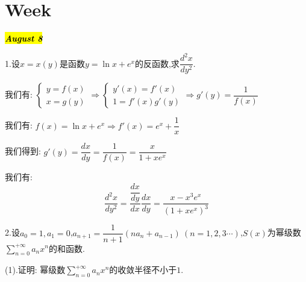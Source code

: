 \section{Week }
\hl{\textbf{\textit{August 8}}}

1.设$x=x(y)$是函数$y=\ln x+e^x$的反函数,求$\dfrac{d^2x}{dy^2}$.
\begin{solution}

	我们有:  $\left\lbrace
	\begin{array}{l}
		y=f(x)\\
		x=g(y)
	\end{array}
	\right. \Rightarrow \left\lbrace
	\begin{array}{l}
		y'(x)=f'(x)\\
		1=f'(x)g'(y)
	\end{array}
	\right. \Rightarrow g'(y)=\dfrac{1}{f(x)}$
	
	我们有:  $f(x)=\ln x+e^x\Rightarrow f'(x)=e^x+\dfrac{1}{x}$
	
	我们得到:  $g'(y)=\dfrac{dx}{dy}=\dfrac{1}{f(x)}=\dfrac{x}{1+xe^x}$
	
	我们有:  
	$$\dfrac{d^2x}{dy^2}=\dfrac{\dfrac{dx}{dy}}{dx}\dfrac{dx}{dy}=\dfrac{x-x^3e^x}{(1+xe^x)^3}$$
\end{solution}

2.设$a_{0}=1,a_{1}=0$,$a_{n+1}=\dfrac{1}{n+1}(na_{n}+a_{n-1})\ (n=1,2,3\cdots)$,$S(x)$为幂级数$\sum\limits_{n=0}^{+\infty}a_{n}x^{n}$的和函数.

(1).证明:  幂级数$\sum\limits_{n=0}^{+\infty}a_{n}x^n$的收敛半径不小于$1$.

